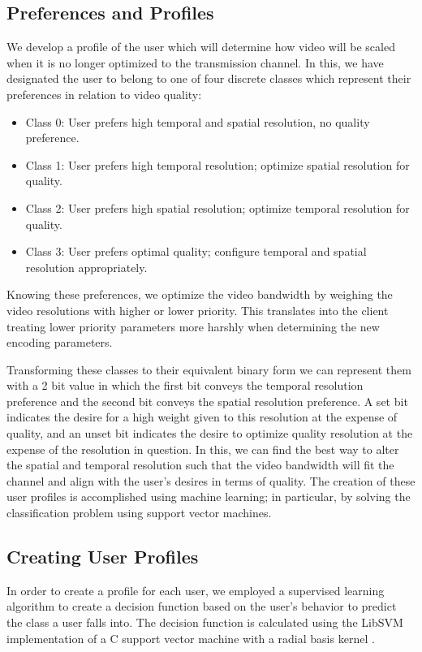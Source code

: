 \documentclass[preprint, 12pt]{elsarticle}
\begin{document}
\subsection{Preferences and Profiles}
We develop a profile of the user which will determine how video will be scaled when it is no longer optimized to the transmission channel. In this, we have designated the user to belong to one of four discrete classes which represent their preferences in relation to video quality:
\begin{itemize}
\item Class 0: User prefers high temporal and spatial resolution, no quality preference.
\item Class 1: User prefers high temporal resolution; optimize spatial resolution for quality.
\item Class 2: User prefers high spatial resolution; optimize temporal resolution for quality.
\item Class 3: User prefers optimal quality; configure temporal and spatial resolution appropriately.
\end{itemize}
Knowing these preferences, we optimize the video bandwidth by weighing the video resolutions with higher or lower priority. This translates into the client treating lower priority parameters more harshly when determining the new encoding parameters.

Transforming these classes to their equivalent binary form we can represent them with a 2 bit value in which the first bit conveys the temporal resolution preference and the second bit conveys the spatial resolution preference. A set bit indicates the desire for a high weight given to this resolution at the expense of quality, and an unset bit indicates the desire to optimize quality resolution at the expense of the resolution in question. In this, we can find the best way to alter the spatial and temporal resolution such that the video bandwidth will fit the channel and align with the user's desires in terms of quality. The creation of these user profiles is accomplished using machine learning; in particular, by solving the classification problem using support vector machines.

\subsection{Creating User Profiles}
In order to create a profile for each user, we employed a supervised learning algorithm to create a decision function based on the user’s behavior to predict the class a user falls into. The decision function is calculated using the LibSVM implementation of a C support vector machine with a radial basis kernel \cite{LibSVM}.
\end{document}
